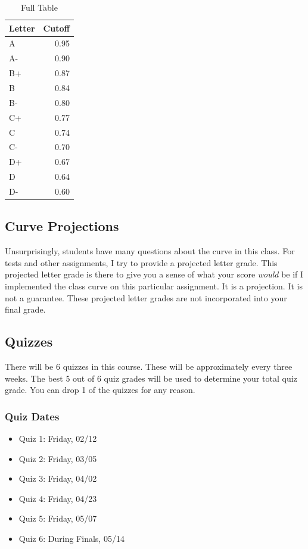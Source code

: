 \documentclass[
]{book}
\begin{document}
\begin{table}

\caption{\label{tab:unnamed-chunk-7}Full Table}
\centering
\begin{tabular}[t]{l|r}
\hline
Letter & Cutoff\\
\hline
A & 0.95\\
\hline
A- & 0.90\\
\hline
B+ & 0.87\\
\hline
B & 0.84\\
\hline
B- & 0.80\\
\hline
C+ & 0.77\\
\hline
C & 0.74\\
\hline
C- & 0.70\\
\hline
D+ & 0.67\\
\hline
D & 0.64\\
\hline
D- & 0.60\\
\hline
\end{tabular}
\end{table}

\subsection*{Curve Projections}\label{curve-projections-2}


Unsurprisingly, students have many questions about the curve in this class. For tests and other assignments, I try to provide a projected letter grade.
This projected letter grade is there to give you a sense of what your score \emph{would} be if I implemented the class curve on this particular assignment.
It is a projection. It is not a guarantee. These projected letter grades are not incorporated into your final grade.

\subsection*{Quizzes}\label{quizzes-2}


There will be 6 quizzes in this course. These will be approximately every three weeks. The best 5 out of 6 quiz grades will be used to determine your total quiz grade. You can drop 1 of the quizzes for any reason.

\subsubsection*{Quiz Dates}\label{quiz-dates-1}


\begin{itemize}
\item
  Quiz 1: Friday, 02/12
\item
  Quiz 2: Friday, 03/05
\item
  Quiz 3: Friday, 04/02
\item
  Quiz 4: Friday, 04/23
\item
  Quiz 5: Friday, 05/07
\item
  Quiz 6: During Finals, 05/14
\end{itemize}
\end{document}
